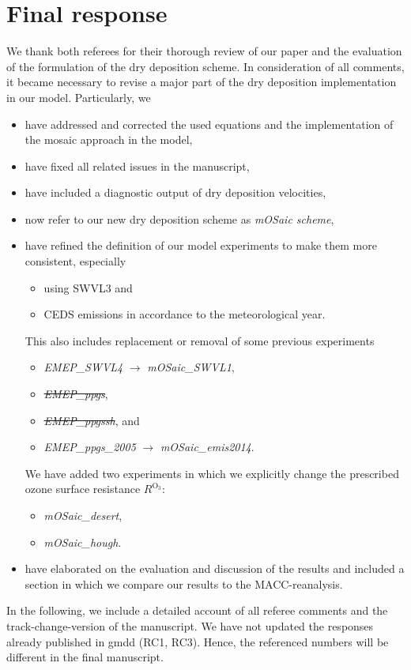 \documentclass{scrartcl}
\begin{document}
\section*{Final response}
We thank both referees for their thorough review of our paper and the evaluation of the formulation of the dry deposition scheme.
In consideration of all comments, it became necessary to revise a major part of the dry deposition implementation in our model. Particularly, we  
\begin{itemize}
  \item have addressed and corrected the used equations and the implementation of the mosaic approach in the model,
  \item have fixed all related issues in the manuscript,
  \item have included a diagnostic output of dry deposition velocities,
  \item now refer to our new dry deposition scheme as \emph{mOSaic scheme},
  \item have refined the definition of our model experiments to make them more consistent, especially
    \begin{itemize}
    \item using SWVL3 and
    \item CEDS emissions in accordance to the meteorological year.
    \end{itemize}
    This also includes replacement or removal of some previous experiments
    \begin{itemize}
    \item \emph{EMEP\_SWVL4} $\rightarrow$ \emph{mOSaic\_SWVL1},
    \item \sout{\emph{EMEP\_ppgs}},
    \item \sout{\emph{EMEP\_ppgssh}}, and
    \item \emph{EMEP\_ppgs\_2005} $\rightarrow$ \emph{mOSaic\_emis2014}.
    \end{itemize}
    We have added two experiments in which we explicitly change the prescribed ozone surface resistance $R^\mathrm{O_3}$:
    \begin{itemize}
    \item \emph{mOSaic\_desert},
    \item\emph{mOSaic\_hough}.
    \end{itemize}
  \item have elaborated on the evaluation and discussion of the results and included a section in which we compare our results to the MACC-reanalysis.
\end{itemize}
In the following, we include a detailed account of all referee comments and the track-change-version of the manuscript. We have not updated the responses already published in gmdd (RC1, RC3). Hence, the referenced numbers will be different in the final manuscript.
\newpage



\newpage
\end{document}
